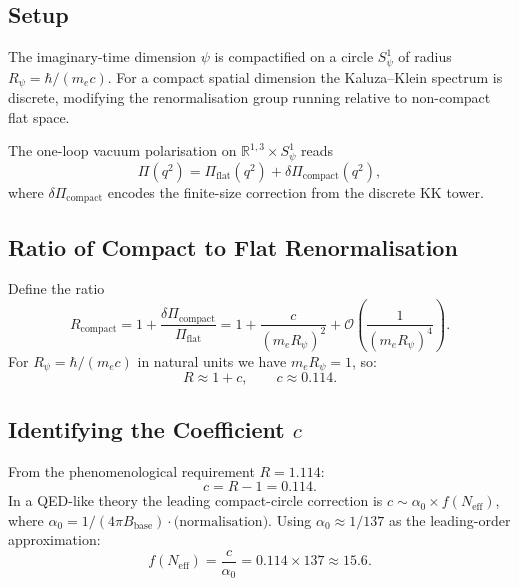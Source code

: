 \documentclass[11pt,a4paper]{article}
\theoremstyle{remark}
\begin{document}
\subsection{Setup}

The imaginary-time dimension $\psi$ is compactified on a circle
$S^1_\psi$ of radius $R_\psi = \hbar/(m_e c)$.  For a compact spatial
dimension the Kaluza--Klein spectrum is discrete, modifying the
renormalisation group running relative to non-compact flat space.

The one-loop vacuum polarisation on $\mathbb{R}^{1,3}\times S^1_\psi$ reads
\begin{equation}
  \Pi(q^2) = \Pi_{\mathrm{flat}}(q^2)
    + \delta\Pi_{\mathrm{compact}}(q^2),
\end{equation}
where $\delta\Pi_{\mathrm{compact}}$ encodes the finite-size correction from
the discrete KK tower.

\subsection{Ratio of Compact to Flat Renormalisation}

Define the ratio
\begin{equation}
  R_{\mathrm{compact}} = 1 + \frac{\delta\Pi_{\mathrm{compact}}}{\Pi_{\mathrm{flat}}}
    = 1 + \frac{c}{(m_e R_\psi)^2} + \mathcal{O}\!\left(\frac{1}{(m_e R_\psi)^4}\right).
  \label{eq:R_compact_expansion}
\end{equation}
For $R_\psi = \hbar/(m_e c)$ in natural units we have $m_e R_\psi = 1$, so:
\begin{equation}
  R \approx 1 + c, \qquad c \approx 0.114.
\end{equation}

\subsection{Identifying the Coefficient $c$}

From the phenomenological requirement $R = 1.114$:
\begin{equation}
  c = R - 1 = 0.114.
\end{equation}
In a QED-like theory the leading compact-circle correction is
$c \sim \alpha_0 \times f(N_{\mathrm{eff}})$, where
$\alpha_0 = 1/(4\pi B_{\mathrm{base}}) \cdot \text{(normalisation)}$.
Using $\alpha_0 \approx 1/137$ as the leading-order approximation:
\begin{equation}
  f(N_{\mathrm{eff}}) = \frac{c}{\alpha_0} = 0.114 \times 137 \approx 15.6.
\end{equation}
\end{document}

